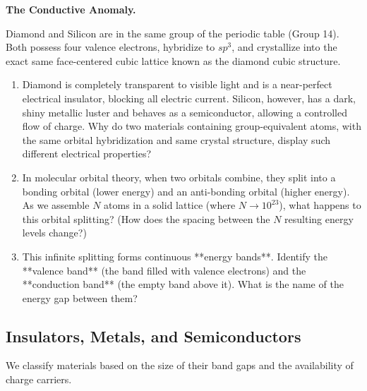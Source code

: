 \documentclass[12pt, a4paper]{book}
\begin{document}
\begin{puzzlebox}
\textbf{The Conductive Anomaly.}

Diamond and Silicon are in the same group of the periodic table (Group 14). Both possess four valence electrons, hybridize to $sp^3$, and crystallize into the exact same face-centered cubic lattice known as the diamond cubic structure.
\begin{enumerate}[label=(a), leftmargin=*]
  \item Diamond is completely transparent to visible light and is a near-perfect electrical insulator, blocking all electric current.
        Silicon, however, has a dark, shiny metallic luster and behaves as a semiconductor, allowing a controlled flow of charge.
        Why do two materials containing group-equivalent atoms, with the same orbital hybridization and same crystal structure, display such different electrical properties?
  \item In molecular orbital theory, when two orbitals combine, they split into a bonding orbital (lower energy) and an anti-bonding orbital (higher energy).
        As we assemble $N$ atoms in a solid lattice (where $N \to 10^{23}$), what happens to this orbital splitting? (How does the spacing between the $N$ resulting energy levels change?)
  \item This infinite splitting forms continuous **energy bands**.
        Identify the **valence band** (the band filled with valence electrons) and the **conduction band** (the empty band above it). What is the name of the energy gap between them?
\end{enumerate}
\end{puzzlebox}

\subsection{Insulators, Metals, and Semiconductors}

We classify materials based on the size of their band gaps and the availability of charge carriers.
\end{document}
